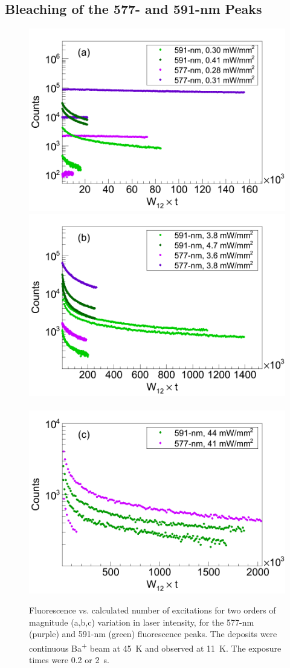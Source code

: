 \subsection{Bleaching of the 577- and 591-nm Peaks}
\label{sec:bleach577and591}

\begin{figure} %
        \centering
                \includegraphics[width=.5\textwidth]{figures/bleach_compareEmission577vs591_specificSigmas_a.png}
                \includegraphics[width=.5\textwidth]{figures/bleach_compareEmission577vs591_specificSigmas_b.png}
                ~
                \includegraphics[width=.5\textwidth]{figures/bleach_compareEmission577vs591_specificSigmas_c.png}
                \caption{Fluorescence vs. calculated number of excitations for two orders of magnitude (a,b,c) variation in laser intensity, for the 577-nm (purple) and 591-nm (green) fluorescence peaks.  The deposits were continuous Ba\textsuperscript{+} beam at 45~K and observed at 11~K.  The exposure times were 0.2 or 2~s.}
\label{fig:bleach_577vs591}
\end{figure}

